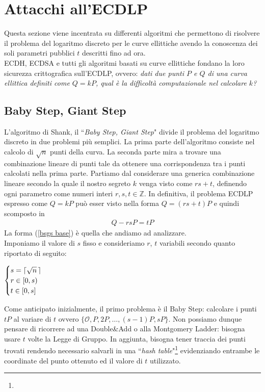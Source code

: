 \documentclass[a4paper,12pt]{tesiinfo}
\DeclarePairedDelimiter\ceil{\lceil}{\rceil}
\renewcommand{\footnotesize}{\fontsize{9pt}{11pt}\selectfont}
\begin{document}
\section{Attacchi all'ECDLP}
Questa sezione viene incentrata su differenti algoritmi che permettono di risolvere il problema del logaritmo discreto per le curve ellittiche avendo la conoscenza dei soli parametri pubblici $t$ descritti fino ad ora.
\\
ECDH, ECDSA e tutti gli algoritmi basati su curve ellittiche fondano la loro sicurezza crittografica sull'ECDLP, ovvero: \emph{dati due punti $P$ e $Q$ di una curva ellittica definiti come $Q = kP$, qual \`e la difficolt\`a computazionale nel calcolare $k$?}
%
%
%
%
%
%
%
%
%
%
%
\subsection{Baby Step, Giant Step}
L'algoritmo di Shank, il ``\textit{Baby Step, Giant Step}" divide il problema del logaritmo discreto in due problemi pi\`u semplici. La prima parte dell'algoritmo consiste nel calcolo di $\sqrt{n}$ punti della curva. La seconda parte mira a trovare una combinazione lineare di punti tale da ottenere una corrispondenza tra i punti calcolati nella prima parte. Partiamo dal considerare una generica combinazione lineare secondo la quale il nostro segreto $k$ venga visto come $rs+t$, definendo ogni parametro come numeri interi $r, s, t \in \mathbb{Z}$. In definitiva, il problema ECDLP espresso come $Q=kP$ pu\`o esser visto nella forma $Q = (rs+t)P$ e quindi scomposto in
\begin{gather}
 Q -rsP = tP \label{bsgs base}
\end{gather}
La forma (\ref{bsgs base}) \`e quella che andiamo ad analizzare.
\\
Imponiamo il valore di $s$ fisso e consideriamo $r$, $t$ variabili secondo quanto riportato di seguito:
\begin{center}$
\begin{cases}
 s=\ceil{\sqrt{n} \,}\\
 r \in [0, s)\\
 t \in [0, s]
\end{cases}$
\end{center}
Come anticipato inizialmente, il primo problema \`e il Baby Step: calcolare i punti $tP$ al variare di $t$ ovvero $\{\mathcal{O}, P, 2P, \ldots, (s-1)P, sP\}$. Non possiamo dunque pensare di ricorrere ad una Double\&Add o alla Montgomery Ladder: bisogna usare $t$ volte la Legge di Gruppo. In aggiunta, bisogna tener traccia dei punti trovati rendendo necessario salvarli in una ``\textit{hash table}"\footnote{\footnotesize{Matrice data da array associativi. Nel nostro caso le chiavi di tali array sono i valori computati di $t$; i valori degli array sono le coordinate di ciascun punto ottenuto.}} evidenziando entrambe le coordinate del punto ottenuto ed il valore di $t$ utilizzato.
\end{document}
